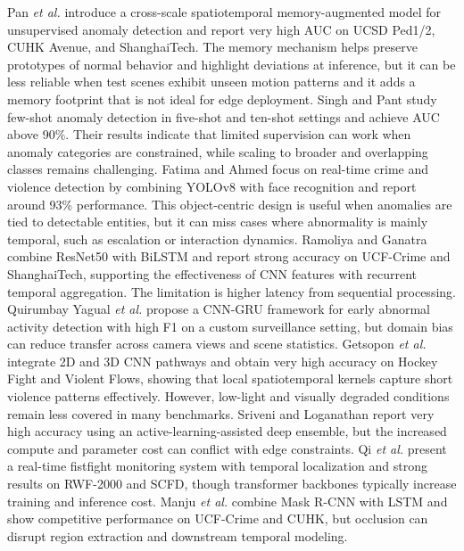 \documentclass[AMA,Times1COL]{WileyNJDv5} %
\begin{document}
Pan \textit{et al.} \cite{b6} introduce a cross-scale spatiotemporal memory-augmented model for unsupervised anomaly detection and report very high AUC on UCSD Ped1/2, CUHK Avenue, and ShanghaiTech. The memory mechanism helps preserve prototypes of normal behavior and highlight deviations at inference, but it can be less reliable when test scenes exhibit unseen motion patterns and it adds a memory footprint that is not ideal for edge deployment. Singh and Pant \cite{b7} study few-shot anomaly detection in five-shot and ten-shot settings and achieve AUC above 90\%. Their results indicate that limited supervision can work when anomaly categories are constrained, while scaling to broader and overlapping classes remains challenging. Fatima and Ahmed \cite{b8} focus on real-time crime and violence detection by combining YOLOv8 with face recognition and report around 93\% performance. This object-centric design is useful when anomalies are tied to detectable entities, but it can miss cases where abnormality is mainly temporal, such as escalation or interaction dynamics. Ramoliya and Ganatra \cite{b9} combine ResNet50 with BiLSTM and report strong accuracy on UCF-Crime and ShanghaiTech, supporting the effectiveness of CNN features with recurrent temporal aggregation. The limitation is higher latency from sequential processing. Quirumbay Yagual \textit{et al.} \cite{b10} propose a CNN-GRU framework for early abnormal activity detection with high F1 on a custom surveillance setting, but domain bias can reduce transfer across camera views and scene statistics. Getsopon \textit{et al.} \cite{b11} integrate 2D and 3D CNN pathways and obtain very high accuracy on Hockey Fight and Violent Flows, showing that local spatiotemporal kernels capture short violence patterns effectively. However, low-light and visually degraded conditions remain less covered in many benchmarks. Sriveni and Loganathan \cite{b12} report very high accuracy using an active-learning-assisted deep ensemble, but the increased compute and parameter cost can conflict with edge constraints. Qi \textit{et al.} \cite{b13} present a real-time fistfight monitoring system with temporal localization and strong results on RWF-2000 and SCFD, though transformer backbones typically increase training and inference cost. Manju \textit{et al.} \cite{b14} combine Mask R-CNN with LSTM and show competitive performance on UCF-Crime and CUHK, but occlusion can disrupt region extraction and downstream temporal modeling.
\end{document}
